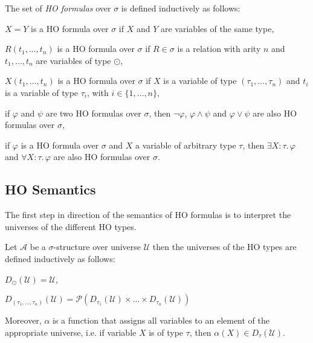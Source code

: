 \begin{definition}
    The set of \emph{HO formulas} over $\sigma$ is defined inductively as follows:
    \begin{compactitem}
        \item $X = Y$ is a HO formula over $\sigma$ if $X$ and $Y$ are variables of the same type,
        \item $R(t_1, \dots, t_n)$ is a HO formula over $\sigma$ if $R \in \sigma$ is a relation with arity $n$ and
        $t_1, \dots, t_n$ are variables of type $\odot$,
        \item $X(t_1, \dots, t_n)$ is a HO formula over $\sigma$ if $X$ is a variable of type $(\tau_1, \dots, \tau_n)$
        and $t_i$ is a variable of type $\tau_i$, with $i \in \{1, \dots, n\}$,
        \item if $\varphi$ and $\psi$ are two HO formulas over $\sigma$, then $\neg\varphi$, $\varphi\wedge\psi$ and $\varphi
        \vee \psi$ are also HO formulas over $\sigma$,
        \item if $\varphi$ is a HO formula over $\sigma$ and $X$ a variable of arbitrary type $\tau$, then $\exists
        X\colon\tau.\,\varphi$ and
        $\forall X\colon\tau.\,\varphi$ are also HO formulas over $\sigma$.
    \end{compactitem}
\end{definition}

\subsection{HO Semantics}\label{subsec:hoSemantics}

The first step in direction of the semantics of HO formulas is to interpret the universes of the different HO types.

\begin{definition}
    Let $\mathcal{A}$ be a $\sigma$-structure over universe $\mathcal{U}$ then the universes of the
    HO types are defined inductively as follows:
    \begin{compactitem}
        \item $D_\odot(\mathcal{U}) = \mathcal{U}$,
        \item $D_{(\tau_1, \dots, \tau_n)}(\mathcal{U}) = \mathcal{P}(D_{\tau_1}(\mathcal{U}) \times \dots \times
        D_{\tau_n}(\mathcal{U}))$
    \end{compactitem}
\end{definition}

Moreover, $\alpha$ is a function that assigns all variables to an element of the appropriate universe, i.e. if
variable $X$ is of type $\tau$, then $\alpha(X) \in D_{\tau}(\mathcal{U})$.


